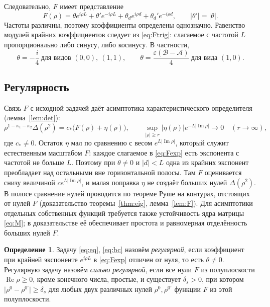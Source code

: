 \documentclass[12pt,a4paper]{article}
\numberwithin{equation}{section}
\theoremstyle{definition}
\newtheorem{definition}{Определение}
\newcommand{\abs}[1]{\lvert#1\rvert}
\newcommand{\Imm}{\operatorname{Im}}
\newcommand{\Ree}{\operatorname{Re}}
\begin{document}
Следовательно, $F$ имеет представление
\begin{equation}\label{eq:Fexp}
 F(\rho)=\theta e^{i\rho L}+\theta'e^{-i\rho L}+\theta_de^{i\rho d}+\theta_d'e^{-i\rho d},
 \qquad \abs{\theta'}=\abs\theta.
\end{equation}
Частоты различны, поэтому коэффициенты определены однозначно. Равенство модулей
крайних коэффициентов следует из \eqref{eq:Ftrig}: слагаемое с частотой $L$
пропорционально либо синусу, либо косинусу. В частности,
\[
 \theta=-\frac i4\ \text{для видов } (0,0),\ (1,1),\qquad
 \theta=\frac{\varepsilon(\mathcal B-\mathcal A)}4\ \text{для вида } (1,0).
\]
\subsection{Регулярность}\label{ss:model}

Связь $F$ с исходной задачей даёт асимптотика характеристического определителя
(лемма~\ref{lem:det}):
\[
 \rho^{1-\kappa_1-\kappa_2}\Delta(\rho^2)=c_\ast\bigl(F(\rho)+\eta(\rho)\bigr),\qquad
 \sup_{\abs\rho\ge r}\abs{\eta(\rho)}e^{-L\abs{\Imm\rho}}\to0\quad(r\to\infty),
\]
где $c_\ast\ne0$. Остаток $\eta$ мал по сравнению с весом $e^{L\abs{\Imm\rho}}$,
который служит естественным масштабом $F$: каждое слагаемое в \eqref{eq:Fexp}
есть экспонента с частотой не больше $L$. Поэтому при $\theta\ne0$ и $\abs d<L$
одна из крайних экспонент преобладает над остальными вне горизонтальной полосы.
Там $F$ оценивается снизу величиной $ce^{L\abs{\Imm\rho}}$, и малая поправка
$\eta$ не создаёт больших нулей $\Delta(\rho^2)$. В полосе сравнение нулей
проводится по теореме Руше на контурах, отстоящих от нулей $F$
(доказательство теоремы~\ref{thm:eig}, лемма~\ref{lem:F}). Для асимптотики
отдельных собственных функций требуется также устойчивость ядра матрицы
\eqref{eq:M}; в доказательстве её обеспечивает простота и равномерная
отделённость больших нулей $F$.

\begin{definition}\label{def:reg}
Задачу \eqref{eq:eq}, \eqref{eq:bc} назовём \emph{регулярной}, если коэффициент при крайней
экспоненте $e^{i\rho L}$ в \eqref{eq:Fexp} отличен от нуля, то есть $\theta\ne0$. Регулярную задачу
назовём \emph{сильно регулярной}, если все нули $F$ из полуплоскости $\Ree\rho\ge0$, кроме конечного числа, простые,
и существует $\delta_s>0$, при котором $\abs{\rho^0-\rho^{0\prime}}\ge\delta_s$ для любых двух
различных нулей $\rho^0,\rho^{0\prime}$ функции $F$ из этой полуплоскости.
\end{definition}
\end{document}
